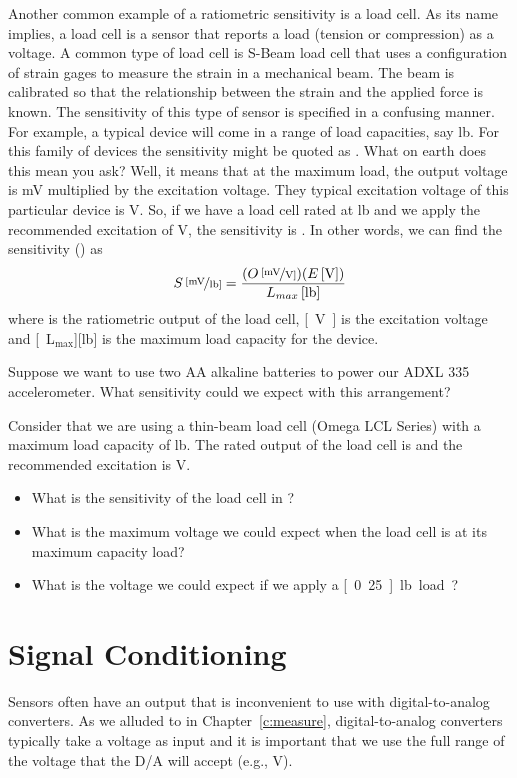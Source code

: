 Another common example of a ratiometric sensitivity is a load cell.  As its name implies, a load cell is a sensor that reports a load (tension or compression) as a voltage.  A common type of load cell is S-Beam load cell that uses a configuration of strain gages to measure the strain in a mechanical beam.  The beam is calibrated so that the relationship between the strain and the applied force is known.  The sensitivity of this type of sensor is specified in a confusing manner.  For example, a typical device will come in a range of load capacities, say \unit[25-10,000]{lb}.  For this family of devices the sensitivity might be quoted as .  What on earth does this mean you ask?  Well, it means that at the maximum load, the output voltage is \unit[3]{mV} multiplied by the excitation voltage.  They typical excitation voltage of this particular device is \unit[10]{V}.  So, if we have a load cell rated at \unit[100]{lb} and we apply the recommended excitation of \unit[10]{V}, the sensitivity is .  In other words, we can find the sensitivity () as
\[
\unitfrac[S]{[mV}{lb]} = \frac{(\unitfrac[O]{[mV}{V]})(\unit[E]{[V]})}{\unit[L_{max}]{[lb]}}
\]
where \unitfrac[O]{[mV}{V]} is the ratiometric output of the load cell, \unit[E]{[V]} is the excitation voltage and \unit[L$_{\mathrm{max}}$]{[lb]} is the maximum load capacity for the device.
\begin{ex}
Suppose we want to use two AA alkaline batteries to power our ADXL 335 accelerometer.  What sensitivity could we expect with this arrangement?
\end{ex}
\begin{ex}
Consider that we are using a thin-beam load cell (Omega LCL Series) with a maximum load capacity of \unit[1]{lb}.  The rated output of the load cell is  and the recommended excitation is \unit[5]{V}.  
\begin{itemize}
\item What is the sensitivity of the load cell in ?
\item What is the maximum voltage we could expect when the load cell is at its maximum capacity load?
\item What is the voltage we could expect if we apply a \unit[0.25]{lb} load?
\end{itemize}
\end{ex}

\section{Signal Conditioning}
Sensors often have an output that is inconvenient to use with digital-to-analog converters.  As we alluded to in Chapter~\ref{c:measure}, digital-to-analog converters typically take a voltage as input and it is important that we use the full range of the voltage that the D/A will accept (e.g., \unit[0--10]{V}).  

